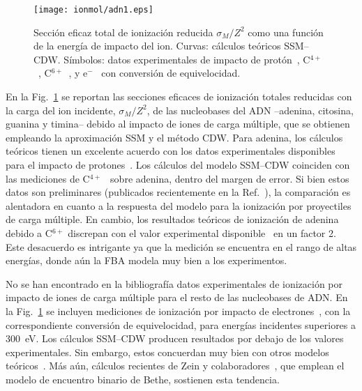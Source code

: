 \begin{figure}
\centering
\texttt{[image: ionmol/adn1.eps]}
\caption[Sección eficaz total de ionización reducida por $Z$ (Parte I).]
{Sección eficaz total de ionización reducida $\sigma_{M}/Z^2$ como 
una función de la energía de impacto del ion. Curvas: cálculos teóricos 
SSM--CDW. Símbolos: datos experimentales de impacto de 
protón~\cite{Iriki:11}, 
C$^{4+}$~\cite{Sens:20}, C$^{6+}$~\cite{Bhattacharjee:19}, y 
e$^-$~\cite{Rahman:16} con conversión de equivelocidad.}
\label{fig:crossDNA_1}
\end{figure} 

En la Fig.~\ref{fig:crossDNA_1} se reportan las secciones eficaces de 
ionización totales reducidas con la carga del ion incidente, 
$\sigma_M/Z^2$, de las nucleobases del ADN --adenina, citosina, guanina 
y timina-- debido al impacto de iones de carga múltiple, que se obtienen 
empleando la aproximación SSM y el método CDW. Para adenina, los 
cálculos teóricos tienen un excelente acuerdo con los datos 
experimentales disponibles para el impacto de protones~\cite{Iriki:11}. 
Los cálculos del modelo SSM--CDW coinciden con las mediciones de 
C$^{4+}$~\cite{Sens:20} sobre adenina, dentro del margen de error. Si 
bien estos datos son preliminares (publicados recientemente en la 
Ref.~\cite{Sens:20}), la 
comparación es alentadora en cuanto a la respuesta del modelo para la 
ionización por proyectiles de carga múltiple. En cambio, los resultados 
teóricos de ionización de adenina debido a C$^{6+}$ discrepan con el 
valor experimental disponible~\cite{Bhattacharjee:19} en un factor 2. 
Este desacuerdo es intrigante ya que la medición se encuentra en el 
rango de altas energías, donde aún la FBA modela muy bien a los 
experimentos.

No se han encontrado en la bibliografía datos experimentales de 
ionización por impacto de iones de carga múltiple para el resto de las 
nucleobases de ADN. En la Fig.~\ref{fig:crossDNA_1} se incluyen 
mediciones de ionización por impacto de electrones~\cite{Rahman:16}, con 
la correspondiente conversión de equivelocidad, para energías incidentes 
superiores a 300~eV. Los cálculos SSM--CDW producen resultados por 
debajo de los valores experimentales. Sin embargo, estos concuerdan muy
bien con otros modelos teóricos~\cite{mozejko2003,tan2018}. Más aún, 
cálculos recientes de Zein y colaboradores~\cite{Zein:21}, que emplean 
el modelo de encuentro binario de Bethe, sostienen esta tendencia.


